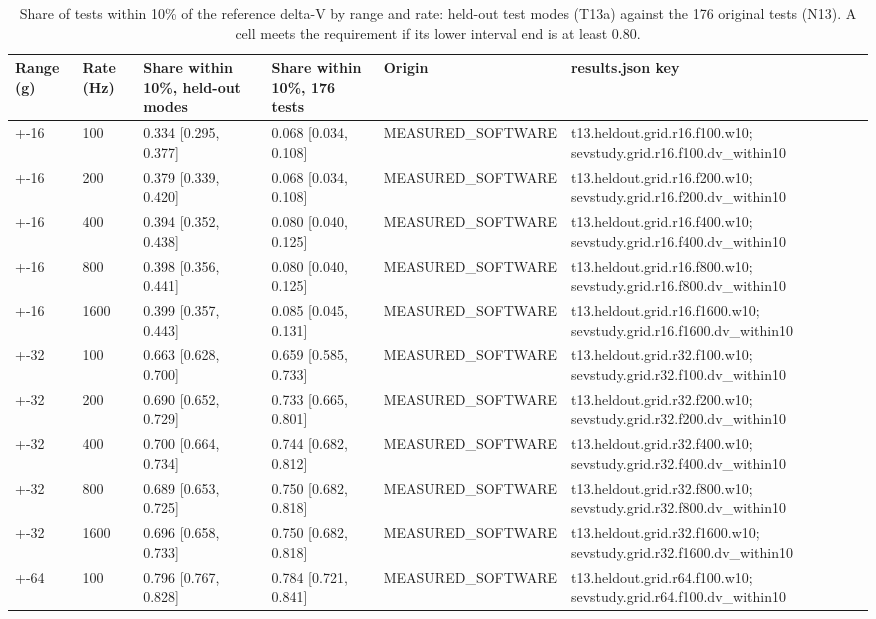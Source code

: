 \begin{table}[t]
\centering
\small
\caption{Share of tests within 10\% of the reference delta-V by range and rate: held-out test modes (T13a) against the 176 original tests (N13). A cell meets the requirement if its lower interval end is at least 0.80.}
\label{tab:jp_tab_t13_grid}
\begin{tabular}{llllll}
\toprule
Range (g) & Rate (Hz) & Share within 10\%, held-out modes & Share within 10\%, 176 tests & Origin & results.json key \\
\midrule
+-16 & 100 & 0.334 [0.295, 0.377] & 0.068 [0.034, 0.108] & MEASURED\_SOFTWARE & t13.heldout.grid.r16.f100.w10; sevstudy.grid.r16.f100.dv\_within10 \\
+-16 & 200 & 0.379 [0.339, 0.420] & 0.068 [0.034, 0.108] & MEASURED\_SOFTWARE & t13.heldout.grid.r16.f200.w10; sevstudy.grid.r16.f200.dv\_within10 \\
+-16 & 400 & 0.394 [0.352, 0.438] & 0.080 [0.040, 0.125] & MEASURED\_SOFTWARE & t13.heldout.grid.r16.f400.w10; sevstudy.grid.r16.f400.dv\_within10 \\
+-16 & 800 & 0.398 [0.356, 0.441] & 0.080 [0.040, 0.125] & MEASURED\_SOFTWARE & t13.heldout.grid.r16.f800.w10; sevstudy.grid.r16.f800.dv\_within10 \\
+-16 & 1600 & 0.399 [0.357, 0.443] & 0.085 [0.045, 0.131] & MEASURED\_SOFTWARE & t13.heldout.grid.r16.f1600.w10; sevstudy.grid.r16.f1600.dv\_within10 \\
+-32 & 100 & 0.663 [0.628, 0.700] & 0.659 [0.585, 0.733] & MEASURED\_SOFTWARE & t13.heldout.grid.r32.f100.w10; sevstudy.grid.r32.f100.dv\_within10 \\
+-32 & 200 & 0.690 [0.652, 0.729] & 0.733 [0.665, 0.801] & MEASURED\_SOFTWARE & t13.heldout.grid.r32.f200.w10; sevstudy.grid.r32.f200.dv\_within10 \\
+-32 & 400 & 0.700 [0.664, 0.734] & 0.744 [0.682, 0.812] & MEASURED\_SOFTWARE & t13.heldout.grid.r32.f400.w10; sevstudy.grid.r32.f400.dv\_within10 \\
+-32 & 800 & 0.689 [0.653, 0.725] & 0.750 [0.682, 0.818] & MEASURED\_SOFTWARE & t13.heldout.grid.r32.f800.w10; sevstudy.grid.r32.f800.dv\_within10 \\
+-32 & 1600 & 0.696 [0.658, 0.733] & 0.750 [0.682, 0.818] & MEASURED\_SOFTWARE & t13.heldout.grid.r32.f1600.w10; sevstudy.grid.r32.f1600.dv\_within10 \\
+-64 & 100 & 0.796 [0.767, 0.828] & 0.784 [0.721, 0.841] & MEASURED\_SOFTWARE & t13.heldout.grid.r64.f100.w10; sevstudy.grid.r64.f100.dv\_within10 \\

\end{tabular}
\end{table}
